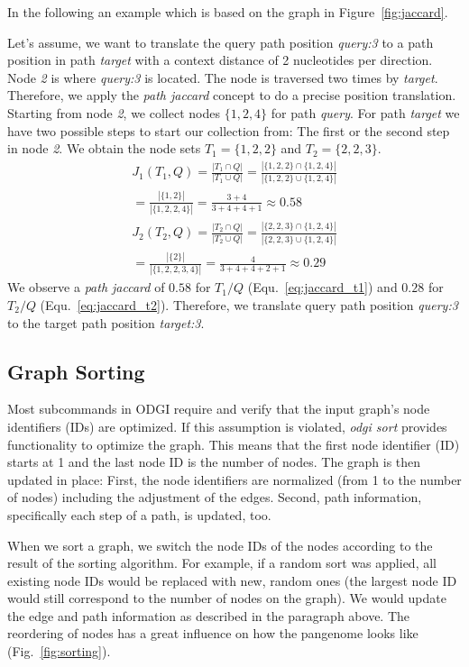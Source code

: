 \documentclass{bioinfo}
\begin{document}
In the following an example which is based on the graph in Figure~\ref{fig:jaccard}.

Let's assume, we want to translate the query path position \textit{query:3} to a path position in path \textit{target} with a context distance of 2 nucleotides per direction. Node \textit{2} is where \textit{query:3} is located. The node is traversed two times by \textit{target}. Therefore, we apply the \textit{path jaccard} concept to do a precise position translation. Starting from node \textit{2}, we collect nodes $\{1,2,4\}$ for path \textit{query}. For path \textit{target} we have two possible steps to start our collection from: The first or the second step in node \textit{2}. We obtain the node sets $T_1=\{1,2,2\}$ and $T_2=\{2,2,3\}$.
\begin{multline}
	J_1(T_1,Q)=\frac{|T_1\cap Q|}{|T_1\cup Q|}=\frac{|\{1,2,2\}\cap \{1,2,4\}|}{|\{1,2,2\}\cup \{1,2,4\}|}\\=\frac{|\{1,2\}|}{|\{1,2,2,4\}|}=\frac{3+4}{3+4+4+1}\approx0.58
	\label{eq:jaccard_t1}
\end{multline}
\begin{multline}
	J_2(T_2,Q)=\frac{|T_2\cap Q|}{|T_2\cup Q|}=\frac{|\{2,2,3\}\cap \{1,2,4\}|}{|\{2,2,3\}\cup \{1,2,4\}|}\\=\frac{|\{2\}|}{|\{1,2,2,3,4\}|}=\frac{4}{3+4+4+2+1}\approx0.29
	\label{eq:jaccard_t2}
\end{multline}
We observe a \textit{path jaccard} of $0.58$ for $T_1/Q$ (Equ.~\ref{eq:jaccard_t1}) and $0.28$ for $T_2/Q$ (Equ.~\ref{eq:jaccard_t2}).
Therefore, we translate query path position \textit{query:3} to the target path position \textit{target:3}.

\subsection{Graph Sorting}
Most subcommands in ODGI require and verify that the input graph’s node identifiers (IDs) are optimized. If this assumption is violated, \textit{odgi sort} provides functionality to optimize the graph. This means that the first node identifier (ID) starts at 1 and the last node ID is the number of nodes. The graph is then updated in place: First, the node identifiers are normalized (from 1 to the number of nodes) including the adjustment of the edges. Second, path information, specifically each step of a path, is updated, too.  

When we sort a graph, we switch the node IDs of the nodes according to the result of the sorting algorithm. For example, if a random sort was applied, all existing node IDs would be replaced with new, random ones (the largest node ID would still correspond to the number of nodes on the graph). We would update the edge and path information as described in the paragraph above. The reordering of nodes has a great influence on how the pangenome looks like (Fig.~\ref{fig:sorting}).

\end{document}
